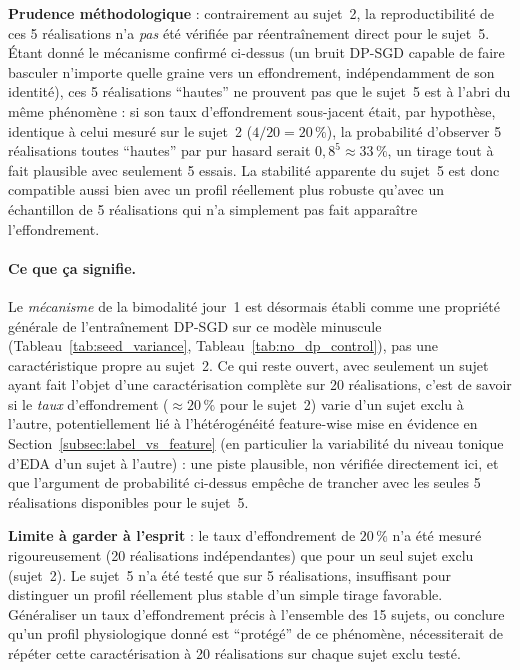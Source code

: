 \documentclass{acmart}
\begin{document}
\textbf{Prudence méthodologique} : contrairement au sujet~2, la
reproductibilité de ces 5 réalisations n'a \emph{pas} été vérifiée par
réentraînement direct pour le sujet~5. Étant donné le mécanisme confirmé
ci-dessus (un bruit DP-SGD capable de faire basculer n'importe quelle
graine vers un effondrement, indépendamment de son identité), ces 5
réalisations ``hautes'' ne prouvent pas que le sujet~5 est à l'abri du même
phénomène : si son taux d'effondrement sous-jacent était, par hypothèse,
identique à celui mesuré sur le sujet~2 ($4/20 = 20\,\%$), la probabilité
d'observer 5 réalisations toutes ``hautes'' par pur hasard serait
$0{,}8^5 \approx 33\,\%$, un tirage tout à fait plausible avec seulement 5
essais. La stabilité apparente du sujet~5 est donc compatible aussi bien
avec un profil réellement plus robuste qu'avec un échantillon de 5
réalisations qui n'a simplement pas fait apparaître l'effondrement.

\paragraph{Ce que ça signifie.} Le \emph{mécanisme} de la bimodalité
jour~1 est désormais établi comme une propriété générale de l'entraînement
DP-SGD sur ce modèle minuscule (Tableau~\ref{tab:seed_variance},
Tableau~\ref{tab:no_dp_control}), pas une caractéristique propre au
sujet~2. Ce qui reste ouvert, avec seulement un sujet ayant fait l'objet
d'une caractérisation complète sur 20 réalisations, c'est de savoir si le
\emph{taux} d'effondrement ($\approx 20\,\%$ pour le sujet~2) varie d'un
sujet exclu à l'autre, potentiellement lié à l'hétérogénéité feature-wise
mise en évidence en Section~\ref{subsec:label_vs_feature} (en particulier
la variabilité du niveau tonique d'EDA d'un sujet à l'autre) : une piste
plausible, non vérifiée directement ici, et que l'argument de probabilité
ci-dessus empêche de trancher avec les seules 5 réalisations disponibles
pour le sujet~5.

\textbf{Limite à garder à l'esprit} : le taux d'effondrement de $20\,\%$
n'a été mesuré rigoureusement (20 réalisations indépendantes) que pour un
seul sujet exclu (sujet~2). Le sujet~5 n'a été testé que sur 5 réalisations,
insuffisant pour distinguer un profil réellement plus stable d'un simple
tirage favorable. Généraliser un taux d'effondrement précis à l'ensemble
des 15 sujets, ou conclure qu'un profil physiologique donné est
``protégé'' de ce phénomène, nécessiterait de répéter cette caractérisation
à 20 réalisations sur chaque sujet exclu testé.
\end{document}

